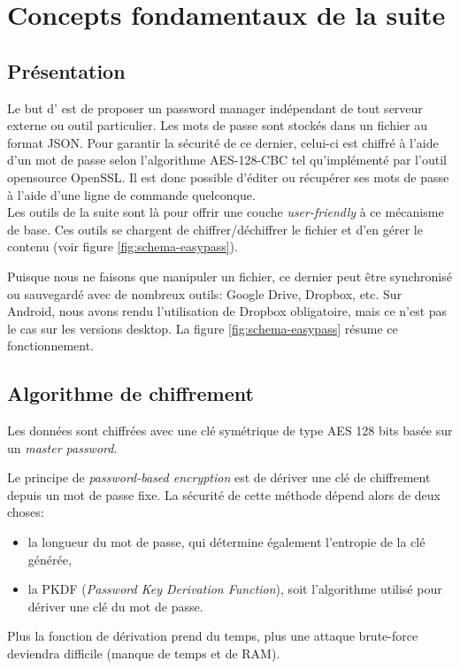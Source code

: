 
\section{Concepts fondamentaux de la suite \easypass{}}

\subsection{Présentation}
Le but d'\easypass{} est de proposer un password manager indépendant de tout serveur externe ou outil particulier. Les mots de passe sont stockés dans un fichier au format JSON. Pour garantir la sécurité de ce dernier, celui-ci est chiffré à l'aide d'un mot de passe selon l'algorithme AES-128-CBC tel qu'implémenté par l'outil opensource OpenSSL. Il est donc possible d'éditer ou récupérer ses mots de passe à l'aide d'une ligne de commande quelconque. \\
Les outils de la suite \easypass{} sont là pour offrir une couche \emph{user-friendly} à ce mécanisme de base. Ces outils se chargent de chiffrer/déchiffrer le fichier et d'en gérer le contenu (voir figure \ref{fig:schema-easypass}). 

Puisque nous ne faisons que manipuler un fichier, ce dernier peut être synchronisé ou sauvegardé avec de nombreux outils: Google Drive, Dropbox, etc. Sur Android, nous avons rendu l'utilisation de Dropbox obligatoire, mais ce n'est pas le cas sur les versions desktop. La figure \ref{fig:schema-easypass} résume ce fonctionnement.


\subsection{Algorithme de chiffrement}

Les données sont chiffrées avec une clé symétrique de type AES 128 bits basée sur un \emph{master password}.

Le principe de \emph{password-based encryption} est de dériver une clé de chiffrement depuis un mot de passe fixe. La sécurité de cette méthode dépend alors de deux choses: 
\begin{itemize}
    \item la longueur du mot de passe, qui détermine également l'entropie de la clé générée,
    \item  la PKDF (\emph{Password Key Derivation Function}), soit l'algorithme utilisé pour dériver une clé du mot de passe.
\end{itemize}
Plus la fonction de dérivation prend du temps, plus une attaque brute-force deviendra difficile (manque de temps et de RAM).

